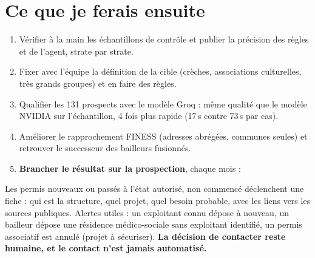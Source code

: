 \documentclass[10pt,a4paper]{article}
\begin{document}
\section{Ce que je ferais ensuite}
\begin{enumerate}[label=\textcolor{accent}{\sffamily\bfseries\arabic*},leftmargin=1.2em,itemsep=2.2pt]
\item Vérifier à la main les échantillons de contrôle et publier la précision des règles et de l'agent, strate par strate.
\item Fixer avec l'équipe la définition de la cible (crèches, associations culturelles, très grands groupes) et en faire des règles.
\item Qualifier les 131 prospects avec le modèle Groq : même qualité que le modèle NVIDIA sur l'échantillon, 4 fois plus rapide (17\,s contre 73\,s par cas).
\item Améliorer le rapprochement FINESS (adresses abrégées, communes seules) et retrouver le successeur des bailleurs fusionnés.
\item \textbf{Brancher le résultat sur la prospection}, chaque mois :
\end{enumerate}
\vspace{3pt}
\begin{center}
\end{center}
\vspace{-5pt}
Les permis nouveaux ou passés à l'état \og autorisé, non commencé\fg{} déclenchent une fiche : qui est la structure, quel projet,
quel besoin probable, avec les liens vers les sources publiques. Alertes utiles : un exploitant connu dépose à nouveau, un bailleur
dépose une résidence médico-sociale sans exploitant identifié, un permis associatif est annulé (projet à sécuriser).
\textbf{La décision de contacter reste humaine, et le contact n'est jamais automatisé.}
\end{document}
